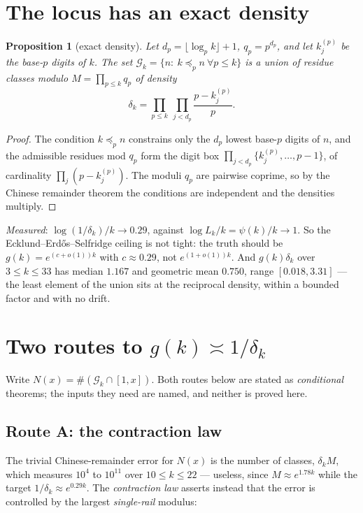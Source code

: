 \documentclass[11pt]{article}
\newtheorem{proposition}[theorem]{Proposition}
\begin{document}
\section{The locus has an exact density}

\begin{proposition}[exact density]\label{prop:delta}
Let $d_p=\lfloor\log_pk\rfloor+1$, $q_p=p^{d_p}$, and let $k_j^{(p)}$ be the base-$p$ digits
of $k$.  The set $\mathcal G_k=\{n:\ k\preceq_pn\ \forall p\le k\}$ is a union of residue
classes modulo $M=\prod_{p\le k}q_p$ of density
\[
  \delta_k=\prod_{p\le k}\ \prod_{j<d_p}\frac{p-k_j^{(p)}}{p}.
\]
\end{proposition}

\begin{proof}
The condition $k\preceq_pn$ constrains only the $d_p$ lowest base-$p$ digits of $n$, and the
admissible residues mod $q_p$ form the digit box $\prod_{j<d_p}\{k_j^{(p)},\dots,p-1\}$, of
cardinality $\prod_j(p-k_j^{(p)})$.  The moduli $q_p$ are pairwise coprime, so by the Chinese
remainder theorem the conditions are independent and the densities multiply.
\end{proof}

\emph{Measured}: $\log(1/\delta_k)/k\to0.29$, against $\log L_k/k=\psi(k)/k\to1$.  So the
Ecklund--Erd\H{o}s--Selfridge ceiling is not tight: the truth should be
$g(k)=e^{(c+o(1))k}$ with $c\approx0.29$, not $e^{(1+o(1))k}$.  And $g(k)\delta_k$ over
$3\le k\le33$ has median $1.167$ and geometric mean $0.750$, range $[0.018,3.31]$ --- the
least element of the union sits at the reciprocal density, within a bounded factor and with
no drift.

\section{Two routes to $g(k)\asymp1/\delta_k$}

Write $N(x)=\#(\mathcal G_k\cap[1,x])$.  Both routes below are stated as \emph{conditional}
theorems; the inputs they need are named, and neither is proved here.

\subsection{Route A: the contraction law}
The trivial Chinese-remainder error for $N(x)$ is the number of classes, $\delta_kM$, which
measures $10^{4}$ to $10^{11}$ over $10\le k\le22$ --- useless, since $M\approx e^{1.78k}$
while the target $1/\delta_k\approx e^{0.29k}$.  The \emph{contraction law} asserts instead
that the error is controlled by the largest \emph{single-rail} modulus:
\end{document}
